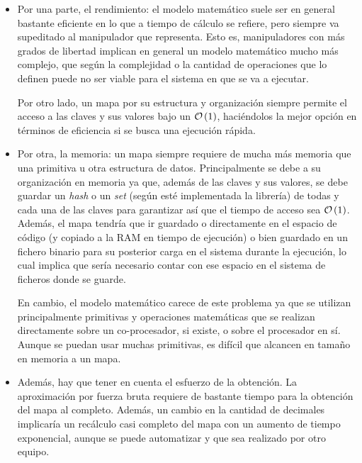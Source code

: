 \begin{itemize}
    \item Por una parte, el rendimiento: el modelo matemático suele ser en general
          bastante eficiente en lo que a tiempo de cálculo se refiere, pero siempre va
          supeditado al manipulador que representa. Esto es, manipuladores con más
          grados de libertad implican en general un modelo matemático mucho más complejo, que según
          la complejidad o la cantidad de operaciones que lo definen puede no ser viable para el sistema en que se va a ejecutar.

          Por otro lado, un mapa por su estructura y organización siempre permite el acceso a las
          claves y sus valores bajo un $\bigO{1}$, haciéndolos la mejor opción en términos
          de eficiencia si se busca una ejecución rápida.

    \item Por otra, la memoria: un mapa siempre requiere de mucha más memoria que
          una primitiva u otra estructura de datos. Principalmente se debe a su organización
          en memoria ya que, además de las claves y sus valores, se debe guardar un \textit{hash}
          o un \textit{set} (según esté implementada la librería) de todas y cada una de las
          claves para garantizar así que el tiempo de acceso sea $\bigO{1}$.
          Además, el mapa tendría que ir guardado o directamente en el espacio de código
          (y copiado a la \ac{RAM} en tiempo de ejecución) o bien guardado en un fichero
          binario para su posterior carga en el sistema durante la ejecución, lo cual implica
          que sería necesario contar con ese espacio en el sistema de ficheros donde se guarde.

          En cambio, el modelo matemático carece de este problema ya que se utilizan
          principalmente primitivas y operaciones matemáticas que se realizan directamente
          sobre un co-procesador, si existe, o sobre el procesador en sí. Aunque se puedan
          usar muchas primitivas, es difícil que alcancen en tamaño en memoria a un mapa.

    \item Además, hay que tener en cuenta el esfuerzo de la obtención. La aproximación
          por fuerza bruta requiere de bastante tiempo para la obtención del mapa al completo.
          Además, un cambio en la cantidad de decimales implicaría un recálculo casi completo del mapa
          con un aumento de tiempo exponencial, aunque se puede automatizar y que sea realizado
          por otro equipo.


\end{itemize}

